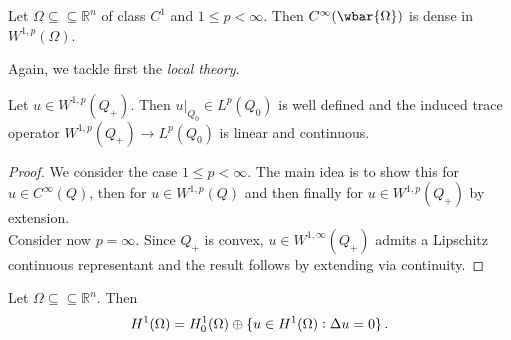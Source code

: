 \begin{corollary}
	Let $\Omega \subseteq \subseteq \mathbb{R}^n$ of class $C^1$ and $1 \leq p < \infty$. Then $C^\infty(\wbar{\Omega})$ is dense in $W^{1,p}(\Omega)$.
\end{corollary}

Again, we tackle first the \emph{local theory}.

\begin{lemma}
	Let $u \in W^{1,p}(Q_+)$. Then $u\vert_{Q_0} \in L^p(Q_0)$ is well defined and the induced trace operator $W^{1,p}(Q_+) \to L^p(Q_0)$ is linear and continuous.
\end{lemma}

\begin{proof}
	We consider the case \underline{$1 \leq p < \infty$}. The main idea is to show this for $u \in C^\infty(Q)$, then for $u \in W^{1,p}(Q)$ and then finally for $u \in W^{1,p}(Q_+)$ by extension.\\
	Consider now \underline{$p = \infty$}. Since $Q_+$ is convex, $u \in W^{1,\infty}(Q_+)$ admits a Lipschitz continuous representant and the result follows by extending via continuity.
\end{proof}

\begin{theorem}
	\label{thm:characterization_H^1}
	Let $\Omega \subseteq \subseteq \mathbb{R}^n$. Then
	\begin{equation*}
		H^1(\Omega) = H^1_0(\Omega) \oplus \cbr[0]{u \in H^1(\Omega) : \Delta u = 0}.
	\end{equation*}
\end{theorem}

